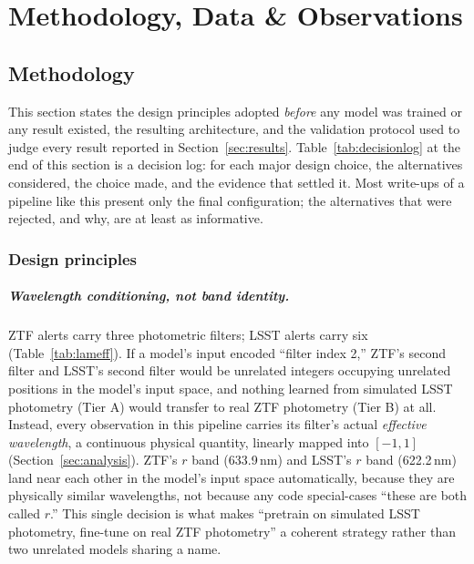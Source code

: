 \chapter{Methodology, Data \& Observations}
\label{sec:methodology-chapter}

\section{Methodology}
\label{sec:methodology}

This section states the design principles adopted \emph{before} any model
was trained or any result existed, the resulting architecture, and the
validation protocol used to judge every result reported in
Section~\ref{sec:results}. Table~\ref{tab:decisionlog} at the end of this
section is a decision log: for each major design choice, the alternatives
considered, the choice made, and the evidence that settled it. Most write-ups
of a pipeline like this present only the final configuration; the
alternatives that were rejected, and why, are at least as informative.

\subsection{Design principles}

\paragraph{Wavelength conditioning, not band identity.}
ZTF alerts carry three photometric filters; LSST alerts carry six
(Table~\ref{tab:lameff}). If a model's input encoded ``filter index 2,''
ZTF's second filter and LSST's second filter would be unrelated integers
occupying unrelated positions in the model's input space, and nothing
learned from simulated LSST photometry (Tier A) would transfer to real ZTF
photometry (Tier B) at all. Instead, every observation in this pipeline
carries its filter's actual \emph{effective wavelength}, a continuous
physical quantity, linearly mapped into $[-1, 1]$
(Section~\ref{sec:analysis}). ZTF's $r$ band (633.9\,nm) and LSST's $r$ band
(622.2\,nm) land near each other in the model's input space automatically,
because they are physically similar wavelengths, not because any code
special-cases ``these are both called $r$.'' This single decision is what
makes ``pretrain on simulated LSST photometry, fine-tune on real ZTF
photometry'' a coherent strategy rather than two unrelated models sharing a
name.

